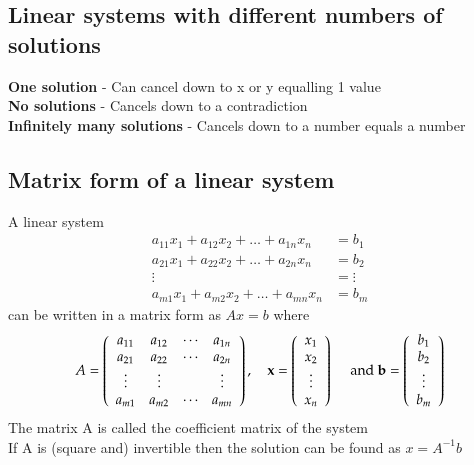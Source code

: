 \documentclass{article}[18pt]
\begin{document}
\subsection{Linear systems with different numbers of solutions}
\textbf{One solution} - Can cancel down to x or y equalling 1 value\\
\textbf{No solutions} - Cancels down to a contradiction\\
\textbf{Infinitely many solutions} - Cancels down to a number equals a number
\subsection{Matrix form of a linear system}
A linear system
$$\begin{aligned} a _ { 11 } x _ { 1 } + a _ { 12 } x _ { 2 } + \ldots + a _ { 1 n } x _ { n } & = b _ { 1 } \\ a _ { 21 } x _ { 1 } + a _ { 22 } x _ { 2 } + \ldots + a _ { 2 n } x _ { n } & = b _ { 2 } \\ \vdots & = \vdots \\ a _ { m 1 } x _ { 1 } + a _ { m 2 } x _ { 2 } + \ldots + a _ { m n } x _ { n } & = b _ { m } \end{aligned}$$
can be written in a matrix form as $Ax=b$ where
$$A = \left( \begin{array} { c c c c } { a _ { 11 } } & { a _ { 12 } } & { \cdots } & { a _ { 1 n } } \\ { a _ { 21 } } & { a _ { 22 } } & { \cdots } & { a _ { 2 n } } \\ { \vdots } & { \vdots } & { } & { \vdots } \\ { a _ { m 1 } } & { a _ { m 2 } } & { \cdots } & { a _ { m n } } \end{array} \right) , \quad \mathbf { x } = \left( \begin{array} { c } { x _ { 1 } } \\ { x _ { 2 } } \\ { \vdots } \\ { x _ { n } } \end{array} \right) \quad \text { and } \mathbf { b } = \left( \begin{array} { c } { b _ { 1 } } \\ { b _ { 2 } } \\ { \vdots } \\ { b _ { m } } \end{array} \right)$$
The matrix A is called the coefficient matrix of the system\\
If A is (square and) invertible then the solution can be found as $x=A^{-1}b$
\end{document}
